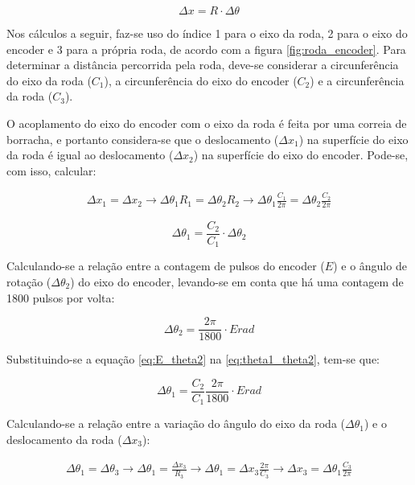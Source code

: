 \begin{equation}
  \Delta x = R \cdot \Delta \theta
  \label{eq:deslocamento_circunferencia}
\end{equation}

Nos cálculos a seguir, faz-se uso do índice 1 para o eixo da roda, 2 para o eixo do encoder e 3 para a própria roda, de acordo com a figura \ref{fig:roda_encoder}. Para determinar a distância percorrida pela roda, deve-se considerar a circunferência do eixo da roda ($C_1$), a circunferência do eixo do encoder ($C_2$) e a circunferência da roda ($C_3$).

O acoplamento do eixo do encoder com o eixo da roda é feita por uma correia de borracha, e portanto considera-se que o deslocamento ($ \Delta x_1$) na superfície do eixo da roda é igual ao deslocamento ($ \Delta x_2$) na superfície do eixo do encoder. Pode-se, com isso, calcular:

\begin{eqnarray*}
   \Delta x_1 =  \Delta x_2 \rightarrow \Delta \theta_1 R_1 = \Delta \theta_2 R_2 \rightarrow \Delta \theta_1 \frac{C_1}{2 \pi} = \Delta \theta_2 \frac{C_2}{2 \pi} 
\end{eqnarray*}

\begin{equation}
  \Delta \theta_1 = \frac{C_2}{C_1} \cdot \Delta \theta_2
  \label{eq:theta1_theta2}
\end{equation}

Calculando-se a relação entre a contagem de pulsos do encoder ($E$) e o ângulo de rotação ($\Delta \theta_2$) do eixo do encoder, levando-se em conta que há uma contagem de 1800 pulsos por volta:

\begin{equation}
  \Delta \theta_2 = \frac{2 \pi}{1800} \cdot E \unit{rad}
  \label{eq:E_theta2}
\end{equation}

Substituindo-se a equação \ref{eq:E_theta2} na \ref{eq:theta1_theta2}, tem-se que:

\begin{equation}
  \Delta \theta_1 = \frac{C_2}{C_1} \frac{2 \pi}{1800} \cdot E \unit{rad}
  \label{eq:theta_1}
\end{equation}

Calculando-se a relação entre a variação do ângulo do eixo da roda ($\Delta \theta_1$) e o deslocamento da roda ($\Delta x_3$):

\begin{eqnarray*}
  \Delta \theta_1 = \Delta \theta_3 \rightarrow \Delta \theta_1 =  \frac{\Delta x_3}{R_3} \rightarrow \Delta \theta_1 = \Delta x_3 \frac{2 \pi}{C_3} \rightarrow  \Delta x_3 = \Delta \theta_1 \frac{C_3}{2 \pi}
\end{eqnarray*}

